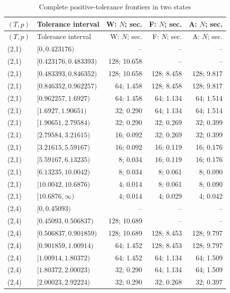 {\small
\setlength{\tabcolsep}{3.5pt}
\begin{longtable}{@{}llrrr@{}}
\caption{Complete positive-tolerance frontiers in two states}\label{tab:frontier49}\\
\toprule
$(T,p)$ & Tolerance interval & W: $N$; sec. & F: $N$; sec. & A: $N$; sec. \\
\midrule
\endfirsthead
\toprule
$(T,p)$ & Tolerance interval & W: $N$; sec. & F: $N$; sec. & A: $N$; sec. \\
\midrule
\endhead
\bottomrule
\endfoot
(2,1) & $[0,0.423176)$ & -- & -- & -- \\
(2,1) & $[0.423176,0.483393)$ & 128; 10.658 & -- & -- \\
(2,1) & $[0.483393,0.846352)$ & 128; 10.658 & 128; 8.458 & 128; 9.817 \\
(2,1) & $[0.846352,0.962257)$ & 64; 1.458 & 128; 8.458 & 128; 9.817 \\
(2,1) & $[0.962257,1.6927)$ & 64; 1.458 & 64; 1.134 & 64; 1.514 \\
(2,1) & $[1.6927,1.90651)$ & 32; 0.290 & 64; 1.134 & 64; 1.514 \\
(2,1) & $[1.90651,2.79584)$ & 32; 0.290 & 32; 0.269 & 32; 0.399 \\
(2,1) & $[2.79584,3.21615)$ & 16; 0.092 & 32; 0.269 & 32; 0.399 \\
(2,1) & $[3.21615,5.59167)$ & 16; 0.092 & 16; 0.119 & 16; 0.176 \\
(2,1) & $[5.59167,6.13235)$ & 8; 0.034 & 16; 0.119 & 16; 0.176 \\
(2,1) & $[6.13235,10.0042)$ & 8; 0.034 & 8; 0.061 & 8; 0.090 \\
(2,1) & $[10.0042,10.6876)$ & 4; 0.014 & 8; 0.061 & 8; 0.090 \\
(2,1) & $[10.6876,\infty)$ & 4; 0.014 & 4; 0.029 & 4; 0.042 \\
(2,4) & $[0,0.45093)$ & -- & -- & -- \\
(2,4) & $[0.45093,0.506837)$ & 128; 10.689 & -- & -- \\
(2,4) & $[0.506837,0.901859)$ & 128; 10.689 & 128; 8.453 & 128; 9.797 \\
(2,4) & $[0.901859,1.00914)$ & 64; 1.452 & 128; 8.453 & 128; 9.797 \\
(2,4) & $[1.00914,1.80372)$ & 64; 1.452 & 64; 1.134 & 64; 1.509 \\
(2,4) & $[1.80372,2.00023)$ & 32; 0.290 & 64; 1.134 & 64; 1.509 \\
(2,4) & $[2.00023,2.92224)$ & 32; 0.290 & 32; 0.268 & 32; 0.397 \\

\end{longtable}}
